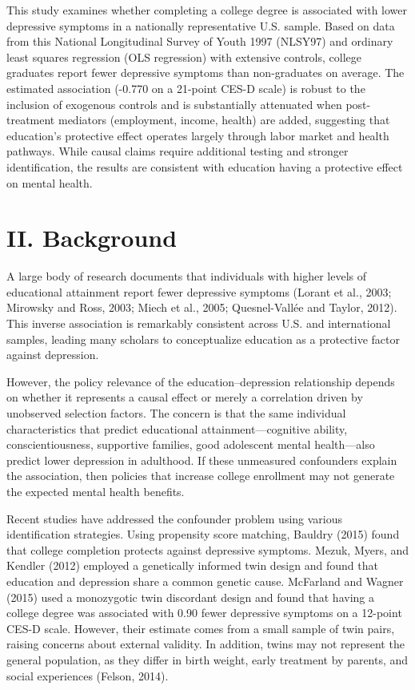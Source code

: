 \documentclass[
  12pt,
]{article}
\begin{document}
This study examines whether completing a college degree is associated
with lower depressive symptoms in a nationally representative U.S.
sample. Based on data from this National Longitudinal Survey of Youth
1997 (NLSY97) and ordinary least squares regression (OLS regression)
with extensive controls, college graduates report fewer depressive
symptoms than non-graduates on average. The estimated association
(-0.770 on a 21-point CES-D scale) is robust to the inclusion of
exogenous controls and is substantially attenuated when post-treatment
mediators (employment, income, health) are added, suggesting that
education's protective effect operates largely through labor market and
health pathways. While causal claims require additional testing and
stronger identification, the results are consistent with education
having a protective effect on mental health.

\section{II. Background}\label{ii.-background}

A large body of research documents that individuals with higher levels
of educational attainment report fewer depressive symptoms (Lorant et
al., 2003; Mirowsky and Ross, 2003; Miech et al., 2005; Quesnel-Vallée
and Taylor, 2012). This inverse association is remarkably consistent
across U.S. and international samples, leading many scholars to
conceptualize education as a protective factor against depression.

However, the policy relevance of the education--depression relationship
depends on whether it represents a causal effect or merely a correlation
driven by unobserved selection factors. The concern is that the same
individual characteristics that predict educational
attainment---cognitive ability, conscientiousness, supportive families,
good adolescent mental health---also predict lower depression in
adulthood. If these unmeasured confounders explain the association, then
policies that increase college enrollment may not generate the expected
mental health benefits.

Recent studies have addressed the confounder problem using various
identification strategies. Using propensity score matching, Bauldry
(2015) found that college completion protects against depressive
symptoms. Mezuk, Myers, and Kendler (2012) employed a genetically
informed twin design and found that education and depression share a
common genetic cause. McFarland and Wagner (2015) used a monozygotic
twin discordant design and found that having a college degree was
associated with 0.90 fewer depressive symptoms on a 12-point CES-D
scale. However, their estimate comes from a small sample of twin pairs,
raising concerns about external validity. In addition, twins may not
represent the general population, as they differ in birth weight, early
treatment by parents, and social experiences (Felson, 2014).
\end{document}

